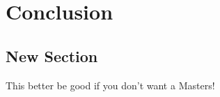 
\chapter[CONCLUSION]{Conclusion}\label{concl}

\section{New Section}
This better be good if you don't want a Masters!
